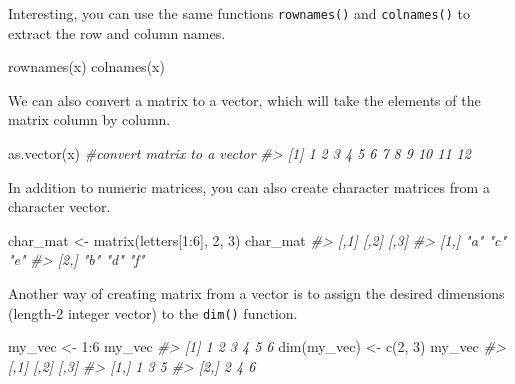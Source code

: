 \documentclass[
]{book}
\newenvironment{Shaded}{\begin{snugshade}}{\end{snugshade}}
\newcommand{\CommentTok}[1]{\textcolor[rgb]{0.56,0.35,0.01}{\textit{#1}}}
\newcommand{\DecValTok}[1]{\textcolor[rgb]{0.00,0.00,0.81}{#1}}
\newcommand{\FunctionTok}[1]{\textcolor[rgb]{0.00,0.00,0.00}{#1}}
\newcommand{\NormalTok}[1]{#1}
\newcommand{\OtherTok}[1]{\textcolor[rgb]{0.56,0.35,0.01}{#1}}
\newcommand{\SpecialCharTok}[1]{\textcolor[rgb]{0.00,0.00,0.00}{#1}}
\begin{document}
Interesting, you can use the same functions \texttt{rownames()} and \texttt{colnames()} to extract the row and column names.

\begin{Shaded}
\begin{Highlighting}[]
\FunctionTok{rownames}\NormalTok{(x)}
\FunctionTok{colnames}\NormalTok{(x)}
\end{Highlighting}
\end{Shaded}

We can also convert a matrix to a vector, which will take the elements of the matrix column by column.

\begin{Shaded}
\begin{Highlighting}[]
\FunctionTok{as.vector}\NormalTok{(x)      }\CommentTok{\#convert matrix to a vector}
\CommentTok{\#\textgreater{}  [1]  1  2  3  4  5  6  7  8  9 10 11 12}
\end{Highlighting}
\end{Shaded}

In addition to numeric matrices, you can also create character matrices from a character vector.

\begin{Shaded}
\begin{Highlighting}[]
\NormalTok{char\_mat }\OtherTok{\textless{}{-}} \FunctionTok{matrix}\NormalTok{(letters[}\DecValTok{1}\SpecialCharTok{:}\DecValTok{6}\NormalTok{], }\DecValTok{2}\NormalTok{, }\DecValTok{3}\NormalTok{)}
\NormalTok{char\_mat}
\CommentTok{\#\textgreater{}      [,1] [,2] [,3]}
\CommentTok{\#\textgreater{} [1,] "a"  "c"  "e" }
\CommentTok{\#\textgreater{} [2,] "b"  "d"  "f"}
\end{Highlighting}
\end{Shaded}

Another way of creating matrix from a vector is to assign the desired dimensions (length-2 integer vector) to the \texttt{dim()} function.

\begin{Shaded}
\begin{Highlighting}[]
\NormalTok{my\_vec }\OtherTok{\textless{}{-}} \DecValTok{1}\SpecialCharTok{:}\DecValTok{6}
\NormalTok{my\_vec}
\CommentTok{\#\textgreater{} [1] 1 2 3 4 5 6}
\FunctionTok{dim}\NormalTok{(my\_vec) }\OtherTok{\textless{}{-}} \FunctionTok{c}\NormalTok{(}\DecValTok{2}\NormalTok{, }\DecValTok{3}\NormalTok{)}
\NormalTok{my\_vec}
\CommentTok{\#\textgreater{}      [,1] [,2] [,3]}
\CommentTok{\#\textgreater{} [1,]    1    3    5}
\CommentTok{\#\textgreater{} [2,]    2    4    6}
\end{Highlighting}
\end{Shaded}
\end{document}
